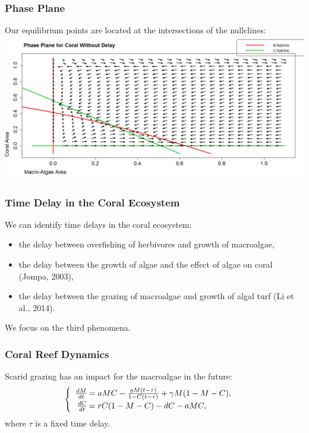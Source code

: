 \begin{frame}\frametitle{Phase Plane} 

  Our equilibrium points are located at the intersections of the nullclines:\\
  \includegraphics[scale=.1]{./nullclines.png}

\end{frame}



\begin{frame}
\frametitle{Time Delay in the Coral Ecosystem}

We can identify time delays in the coral ecosystem:
\begin{itemize}
\item the delay between overfishing of herbivores and growth of
  macroalgae,
\item the delay between the growth of algae and the effect of algae on
  coral (Jompa, 2003),
\item the delay between the grazing of macroalgae and growth of algal
  turf (Li et al., 2014).
\end{itemize} We focus on the third phenomena.

\end{frame}


\begin{frame}\frametitle{Coral Reef Dynamics}
Scarid grazing has an impact for the macroalgae in the future:
$$\begin{cases}
  \begin{array}{rl}
    \frac{dM}{dt}\hspace{-.8em}&=aMC - \frac{gM(t-\tau)}{1-C(t-\tau)} + \gamma M (1-M-C),\\
    \frac{dC}{dt}\hspace{-.8em}&=rC(1-M-C) - dC - aMC,\\
  \end{array}
\end{cases}$$ where $\tau$ is a fixed time delay.
\end{frame}


